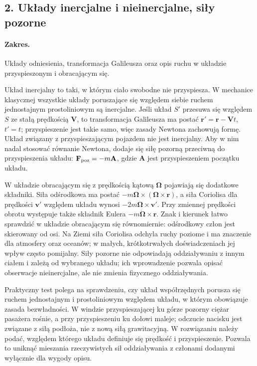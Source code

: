 \documentclass[11pt,a4paper]{article}
\begin{document}
\subsection{2. Układy inercjalne i nieinercjalne, siły pozorne}
\paragraph{Zakres.} Układy odniesienia, transformacja Galileusza oraz opis ruchu w układzie przyspieszonym i obracającym się.

Układ inercjalny to taki, w którym ciało swobodne nie przyspiesza. W mechanice klasycznej wszystkie układy poruszające się względem siebie ruchem jednostajnym prostoliniowym są inercjalne. Jeśli układ $S'$ przesuwa się względem $S$ ze stałą prędkością $\mathbf V$, to transformacja Galileusza ma postać $\mathbf r'=\mathbf r-\mathbf Vt$, $t'=t$; przyspieszenie jest takie samo, więc zasady Newtona zachowują formę. Układ związany z przyspieszającym pojazdem nie jest inercjalny. Aby w nim nadal stosować równanie Newtona, dodaje się siłę pozorną przeciwną do przyspieszenia układu: $\mathbf F_{\rm poz}=-m\mathbf A$, gdzie $\mathbf A$ jest przyspieszeniem początku układu.

W układzie obracającym się z prędkością kątową $\boldsymbol\Omega$ pojawiają się dodatkowe składniki. Siła odśrodkowa ma postać $-m\boldsymbol\Omega\times(\boldsymbol\Omega\times\mathbf r)$, a siła Coriolisa dla prędkości $\mathbf v'$ względem układu wynosi $-2m\boldsymbol\Omega\times\mathbf v'$. Przy zmiennej prędkości obrotu występuje także składnik Eulera $-m\dot{\boldsymbol\Omega}\times\mathbf r$. Znak i kierunek łatwo sprawdzić w układzie obracającym się równomiernie: odśrodkowy człon jest skierowany od osi. Na Ziemi siła Coriolisa odchyla ruchy poziome i ma znaczenie dla atmosfery oraz oceanów; w małych, krótkotrwałych doświadczeniach jej wpływ często pomijalny. Siły pozorne nie odpowiadają oddziaływaniu z innym ciałem i zależą od wybranego układu; ich wprowadzenie pozwala opisać obserwacje nieinercjalne, ale nie zmienia fizycznego oddziaływania.

Praktyczny test polega na sprawdzeniu, czy układ współrzędnych porusza się ruchem jednostajnym i prostoliniowym względem układu, w którym obowiązuje zasada bezwładności. W windzie przyspieszającej ku górze pozorny ciężar pasażera rośnie, a przy przyspieszeniu ku dołowi maleje; odczucie nacisku jest związane z siłą podłoża, nie z nową siłą grawitacyjną. W rozwiązaniu należy podać, względem którego układu definiuje się prędkość i przyspieszenie. Pozwala to uniknąć mieszania rzeczywistych sił oddziaływania z członami dodanymi wyłącznie dla wygody opisu.
\end{document}
